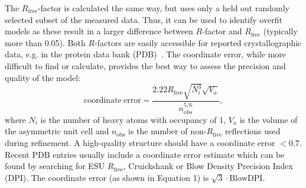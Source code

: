 \documentclass[9pt,bestpractices,pubversion]{livecoms}
\begin{document}
The $R_{\mathrm{free}}$-factor is calculated the same way, but uses only a held out randomly selected subset of the measured data. Thus, it can be used to identify overfit models as these result in a larger difference between $R$-factor and $R_{\mathrm{free}}$ (typically more than 0.05).
Both $R$-factors are easily accessible for reported crystallographic data, e.g. in the protein data bank (PDB)~\cite{bermanProteinDataBank2000}. 
%
The coordinate error, while more difficult to find or calculate, provides the best way to assess the precision and quality of the model:
%
\begin{equation}
    \mathrm{coordinate\ error} = \frac{2.22 R_{\mathrm{free}}\sqrt{N_i^3}\sqrt{V_a}} {n_{\mathrm{obs}}^{5/6}},
    \label{eq:coordinate_error}
\end{equation}
%
where $N_i$ is the number of heavy atoms with occupancy of 1, $V_a$ is the volume of the asymmetric unit cell and $n_{\mathrm{obs}}$ is the number of non-$R_{\mathrm{free}}$ reflections used during refinement. A high-quality structure should have a coordinate error $<0.7$. Recent PDB entries usually include a coordinate error estimate which can be found by searching for ESU $R_{\mathrm{free}}$, Cruickshank or Blow Density Precision Index (DPI). The coordinate error (as shown in Equation 1) is $\sqrt{3}\cdot \mathrm{BlowDPI}$. 
\end{document}
